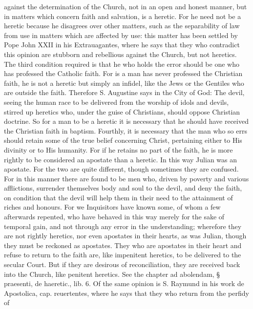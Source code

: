        against the determination of the Church, not in an open and honest manner, but in matters
       which concern faith and salvation, is a heretic. For he need not be a heretic because he
       disagrees over other matters, such as the separability of law from use in matters which are
       affected by use: this matter has been settled by Pope John XXII in his Extrauagantes, where
       he says that they who contradict this opinion are stubborn and rebellious against the Church,
       but not heretics.
             The third condition required is that he who holds the error should be one who has
       professed the Catholic faith. For is a man has never professed the Christian faith, he is not a
       heretic but simply an infidel, like the Jews or the Gentiles who are outside the faith.
       Therefore S. Augustine says in the City of God: The devil, seeing the human race to be
       delivered from the worship of idols and devils, stirred up heretics who, under the guise of
       Christians, should oppose Christian doctrine. So for a man to be a heretic it is necessary that
       he should have received the Christian faith in baptism.
             Fourthly, it is necessary that the man who so errs should retain some of the true belief
       concerning Christ, pertaining either to His divinity or to His humanity. For if he retains no
       part of the faith, he is more rightly to be considered an apostate than a heretic. In this way
       Julian was an apostate. For the two are quite different, though sometimes they are confused.
       For in this manner there are found to be men who, driven by poverty and various afflictions,
       surrender themselves body and soul to the devil, and deny the faith, on condition that the
       devil will help them in their need to the attainment of riches and honours.
             For we Inquisitors have known some, of whom a few afterwards repented, who have
       behaved in this way merely for the sake of temporal gain, and not through any error in the
       understanding; wherefore they are not rightly heretics, nor even apostates in their hearts, as
       was Julian, though they must be reckoned as apostates.
             They who are apostates in their heart and refuse to return to the faith are, like
       impenitent heretics, to be delivered to the secular Court. But if they are desirous of
       reconciliation, they are received back into the Church, like penitent heretics. See the chapter
       ad abolendam, § praesenti, de haeretic., lib. 6. Of the same opinion is S. Raymund in his
       work de Apostolica, cap. reuertentes, where he says that they who return from the perfidy of
